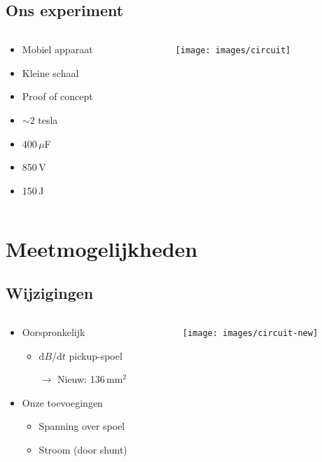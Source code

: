 \documentclass{beamer}
\newcommand{\derivs}[2]{\mathrm d #1 / \mathrm d #2}
\begin{document}
\subsection{Ons experiment}
\begin{frame}
\begin{columns}
\begin{column}{0.5\textwidth}
	\begin{itemize}
	\item Mobiel apparaat
	\item Kleine schaal
	\item Proof of concept
	\item $\sim2$ tesla
	\item 400\,$\mu$F
	\item 850\,V
	\item 150\,J
	\end{itemize}
\end{column}
\begin{column}{0.5\textwidth}
	\begin{center}
	\texttt{[image: images/circuit]}
	\end{center}
\end{column}
\end{columns}

\end{frame}

\section{Meetmogelijkheden}
\subsection{Wijzigingen}
\begin{frame}
\begin{columns}
\begin{column}{0.5\textwidth}
	\begin{itemize}
	\item Oorspronkelijk
		\begin{itemize}
		\item $\derivs{B}{t}$ pickup-spoel
		\item[$\rightarrow$] Nieuw: 136\,mm$^2$
		\end{itemize}
	\item Onze toevoegingen
		\begin{itemize}
		\item Spanning over spoel
		\item Stroom (door shunt)
		\end{itemize}
	\end{itemize}
\end{column}
\begin{column}{0.5\textwidth}
	\begin{center}
	\texttt{[image: images/circuit-new]}
	\end{center}
\end{column}
\end{columns}
\end{frame}
\end{document}
